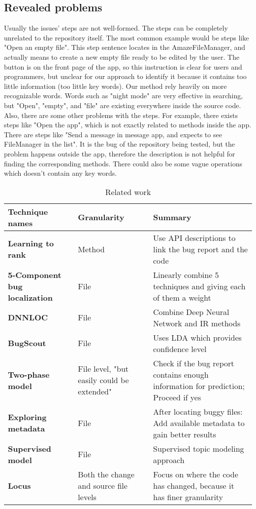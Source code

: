 \documentclass[sigconf]{acmart}
\begin{document}
\subsection{Revealed problems}
Usually the issues' steps are not well-formed. The steps can be completely unrelated to the repository itself. The most common example would be steps like "Open an empty file". This step sentence locates in the AmazeFileManager, and actually means to create a new empty file ready to be edited by the user. The button is on the front page of the app, so this instruction is clear for users and programmers, but unclear for our approach to identify it because it contains too little information (too little key words). Our method rely heavily on more recognizable words. Words such as "night mode" are very effective in searching, but "Open", "empty", and "file" are existing everywhere inside the source code.
Also, there are some other problems with the steps. For example, there exists steps like "Open the app", which is not exactly related to methods inside the app. There are steps like "Send a message in message app, and expects to see FileManager in the list". It is the bug of the repository being tested, but the problem happens outside the app, therefore the description is not helpful for finding the corresponding methods. There could also be some vague operations which doesn't contain any key words.

\begin{table*}[]
	\begin{tabular}{|p{2.7cm}|p{3cm}|p{10.4cm}|}
		\hline
		\textbf{Technique names}            & \textbf{Granularity} & \textbf{Summary } \\ \hline
		\textbf{Learning to rank}         & Method&	Use API descriptions to link the bug report and the code \\ \hline
		\textbf{5-Component bug localization}         & File &	Linearly combine 5 techniques and giving each of them a weight \\ \hline
		\textbf{DNNLOC}         &  File &	Combine Deep Neural Network and IR methods\\ \hline
		\textbf{BugScout}         & File &	Uses LDA which provides confidence level \\ \hline
		\textbf{Two-phase model}         & File level, "but easily could be extended"  &	Check if the bug report contains enough information for prediction; Proceed if yes  \\ \hline
		\textbf{Exploring metadata}         & File &	After locating buggy files: Add available metadata to gain better results \\ \hline
		\textbf{Supervised model}         & File &	Supervised topic modeling approach \\ \hline
		\textbf{Locus}         & Both the change and source file levels	& Focus on where the code has changed, because it has finer granularity \\ \hline
		
	\end{tabular}
	\caption{Related work}
	\label{table:relatedWork}
\end{table*}
\end{document}
